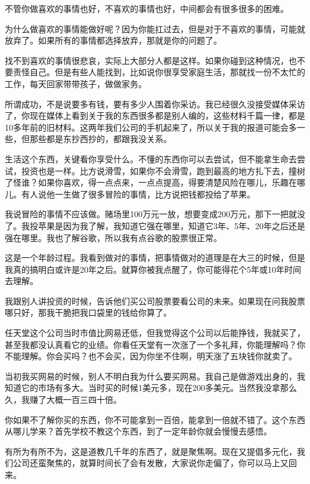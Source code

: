 不管你做喜欢的事情也好，不喜欢的事情也好，中间都会有很多很多的困难。

为什么做喜欢的事情能做好呢？因为你能扛过去，但是对于不喜欢的事情，可能就放弃了。如果所有的事情都选择放弃，那就是你的问题了。

找不到喜欢的事情很悲哀，实际上大部分人都是这样。如果你碰到这种情况，也不要责怪自己。但是有些人能找到，比如说你很享受家庭生活，那就找一份不太忙的工作，每天回家带带孩子，做做家务。

所谓成功，不是说要多有钱，要有多少人围着你采访。我已经很久没接受媒体采访了，你现在媒体上看到关于我的东西很多都是别人编的，这些材料千篇一律，都是10多年前的旧材料。这两年我们公司的手机起来了，所以关于我的报道可能会多一些，但那些都是东抄西抄的，都跟我没关系。


生活这个东西，关键看你享受什么。不懂的东西你可以去尝试，但不能拿生命去尝试，投资也是一样。比方说滑雪，如果你不会滑雪，跑到最高的地方扎下去，撞树了怪谁？如果你喜欢，得一点点来，一点点提高，得要清楚风险在哪儿，乐趣在哪儿。有人说他一生做了很多冒险的事情，比方说把钱都投给了苹果。

我说冒险的事情不应该做。赌场里100万元一放，想要变成200万元，那下一把就没了。我投苹果是因为我了解，我知道它强在哪里，知道它3年、5年、20年之后还是强在哪里。我也了解谷歌，所以我有点谷歌的股票很正常。


这是一个年龄过程。我看到做对的事情，把事情做对的道理是在大三的时候，但是我真的搞明白或许是20年之后。就算你被我点醒了，你可能得花个5年或10年时间去理解。

我跟别人讲投资的时候，告诉他们买公司股票要看公司的未来。如果现在问我股票哪只好，那我干脆把我口袋里的钱给你算了。

任天堂这个公司当时市值比网易还低，但我觉得这个公司以后能挣钱，我就买了，甚至我都没认真看它的业绩。你看任天堂有一次涨了一个多礼拜，你能理解吗？你不能理解。你会买吗？也不会买，因为你坐不住啊，明天涨了五块钱你就卖了。

当初我买网易的时候，别人不明白我为什么要买网易。我自己是做游戏出身的，我知道它的市场有多大。当时买的时候1美元多，现在200多美元。当然我没拿那么久，我赚了大概一百三四十倍。

你如果不了解你买的东西，你不可能拿到一百倍，能拿到一倍就不错了。这个东西从哪儿学来？首先学校不教这个东西，到了一定年龄你就会慢慢去感悟。

有所为有所不为，这是道教几千年的东西了，就是聚焦啊。现在又提倡多元化，我们公司还蛮聚焦的，就算时间长了会有发散，大家说你走偏了，你可以马上又回来。

